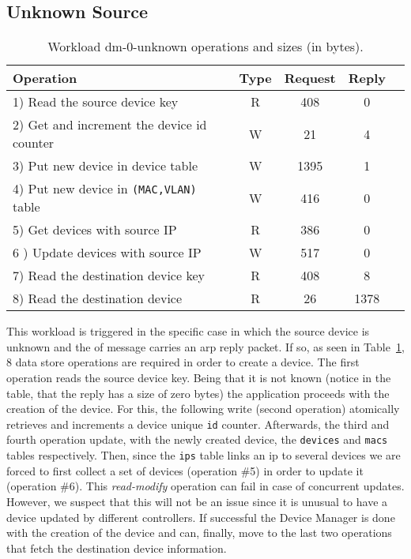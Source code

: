 \subsection{Unknown Source}
\small
\begin{table}[ht]
\centering 
\begin{tabular}{l c c c c}
Operation & Type & Request & Reply \\ \toprule 
1) Read the source device key & R & 408 & 0\\
2) Get and increment the device id counter & W & 21 & 4\\
3) Put new device in device table & W & 1395 & 1\\
4) Put new device in \texttt{(MAC,VLAN)} table & W & 416 & 0\\
5) Get devices with source IP & R & 386 & 0\\
6 ) Update devices with source IP & W & 517 & 0\\
7) Read the destination device key & R & 408 & 8\\
8) Read the destination device & R & 26 & 1378 \\\bottomrule
\end{tabular}
\caption[Workload dm-0-unknown operations]{Workload dm-0-unknown operations
  and sizes (in bytes).}
\label{table:ops:dm-0-unknown}
\end{table}

This workload is triggered in the specific case in which  the source device is unknown and the \gls{of} message carries an \gls{arp} reply 
packet. 
If so, as seen in Table~\ref{table:ops:dm-0-unknown},  8 data store operations are required in order to create a device.  
The first operation reads the  source device key.  
Being that it is not known (notice in the table, that the reply has a size  of zero bytes) the application proceeds with the creation of the device. 
For this, the following write (second operation) atomically retrieves and increments a device unique \texttt{id} counter. 
Afterwards, the third and fourth  operation update, with the newly created device, the \texttt{devices} and \texttt{macs} tables respectively. 
Then, since the \texttt{ips} table links an \gls{ip} to several devices we are forced to first collect a set of devices  (operation \#5) in order to update it (operation \#6).  
This \emph{read-modify} operation can fail in case of concurrent updates.
However, we suspect that this will not be an issue since it is unusual to have a device updated by different controllers.
If successful the Device Manager is done with the creation of the device and can, finally, move to the last two operations that fetch the destination device information. 


